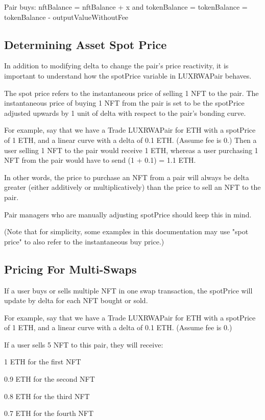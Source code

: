 \documentclass[11pt]{article}
\begin{document}
Pair buys: nftBalance = nftBalance + x and tokenBalance = tokenBalance = tokenBalance - outputValueWithoutFee


\subsection{Determining Asset Spot Price}

In addition to modifying delta to change the pair's price reactivity, it is important to understand how the spotPrice variable in LUXRWAPair behaves.


The spot price refers to the instantaneous price of selling 1 NFT to the pair. The instantaneous price of buying 1 NFT from the pair is set to be the spotPrice adjusted upwards by 1 unit of delta with respect to the pair's bonding curve.


For example, say that we have a Trade LUXRWAPair for ETH with a spotPrice of 1 ETH, and a linear curve with a delta of 0.1 ETH. (Assume fee is 0.) Then a user selling 1 NFT to the pair would receive 1 ETH, whereas a user purchasing 1 NFT from the pair would have to send (1 + 0.1) = 1.1 ETH.


In other words, the price to purchase an NFT from a pair will always be delta greater (either additively or multiplicatively) than the price to sell an NFT to the pair.


Pair managers who are manually adjusting spotPrice should keep this in mind.


(Note that for simplicity, some examples in this documentation may use "spot price" to also refer to the instantaneous buy price.)


\subsection{Pricing For Multi-Swaps}

If a user buys or sells multiple NFT in one swap transaction, the spotPrice will update by delta for each NFT bought or sold.


For example, say that we have a Trade LUXRWAPair for ETH with a spotPrice of 1 ETH, and a linear curve with a delta of 0.1 ETH. (Assume fee is 0.)


If a user sells 5 NFT to this pair, they will receive:


1 ETH for the first NFT


0.9 ETH for the second NFT


0.8 ETH for the third NFT


0.7 ETH for the fourth NFT
\end{document}
